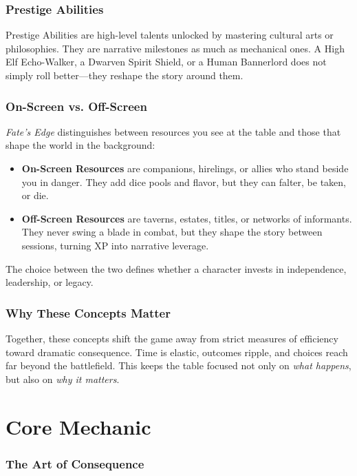 \documentclass[12pt]{article}
\begin{document}
\section{Prestige Abilities}
Prestige Abilities are high-level talents unlocked by mastering cultural arts or philosophies. They are narrative milestones as much as mechanical ones. A High Elf Echo-Walker, a Dwarven Spirit Shield, or a Human Bannerlord does not simply roll better—they reshape the story around them.  

\section{On-Screen vs. Off-Screen}
\textit{Fate’s Edge} distinguishes between resources you see at the table and those that shape the world in the background:
\begin{itemize}
  \item \textbf{On-Screen Resources} are companions, hirelings, or allies who stand beside you in danger. They add dice pools and flavor, but they can falter, be taken, or die.  
  \item \textbf{Off-Screen Resources} are taverns, estates, titles, or networks of informants. They never swing a blade in combat, but they shape the story between sessions, turning XP into narrative leverage.  
\end{itemize}
The choice between the two defines whether a character invests in independence, leadership, or legacy.  

\section{Why These Concepts Matter}
Together, these concepts shift the game away from strict measures of efficiency toward dramatic consequence. Time is elastic, outcomes ripple, and choices reach far beyond the battlefield. This keeps the table focused not only on \emph{what happens}, but also on \emph{why it matters}.

\part{Core Mechanic}
\section{The Art of Consequence}
\end{document}
